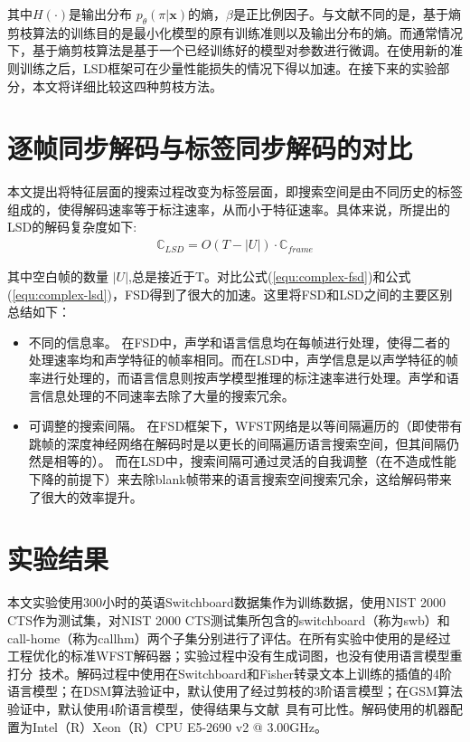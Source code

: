 其中$H(\cdot)$是输出分布 $p_\theta (\pi|\mathbf{x})$的熵，$\beta$是正比例因子。与文献\cite{pereyra2017regularizing}不同的是，基于熵剪枝算法的训练目的是最小化模型的原有训练准则以及输出分布的熵。而通常情况下，基于熵剪枝算法是基于一个已经训练好的模型对参数进行微调。在使用新的准则训练之后，LSD框架可在少量性能损失的情况下得以加速。在接下来的实验部分，本文将详细比较这四种剪枝方法。



\section{逐帧同步解码与标签同步解码的对比}
\label{chap:lsd-lsd-hmm-alg}

本文提出将特征层面的搜索过程改变为标签层面，即搜索空间是由不同历史的标签组成的，使得解码速率等于标注速率，从而小于特征速率。具体来说，所提出的LSD的解码复杂度如下:
  \begin{equation}
\label{equ:complex-lsd}
\begin{split}
\mathbb{C}_{LSD} = O (T-|U|) \cdot \mathbb{C}_{frame}
\end{split}
\end{equation}


其中空白帧的数量 $|U|$,总是接近于T。对比公式(\ref{equ:complex-fsd})和公式(\ref{equ:complex-lsd})，FSD得到了很大的加速。这里将FSD和LSD之间的主要区别总结如下：
\begin{itemize}
\item 不同的信息率。 在FSD中，声学和语言信息均在每帧进行处理，使得二者的处理速率均和声学特征的帧率相同。而在LSD中，声学信息是以声学特征的帧率进行处理的，而语言信息则按声学模型推理的标注速率进行处理。声学和语言信息处理的不同速率去除了大量的搜索冗余。
\item 可调整的搜索间隔。 在FSD框架下，WFST网络是以等间隔遍历的（即使带有跳帧的深度神经网络在解码\cite{vanhoucke2013multiframe}时是以更长的间隔遍历语言搜索空间，但其间隔仍然是相等的）。 而在LSD中，搜索间隔可通过灵活的自我调整（在不造成性能下降的前提下）来去除blank帧带来的语言搜索空间搜索冗余，这给解码带来了很大的效率提升。
\end{itemize}


\section{实验结果}
\label{chap:lsd-exp}

本文实验使用300小时的英语Switchboard数据集作为训练数据\cite{godfrey1992switchboard}，使用NIST 2000 CTS作为测试集，对NIST 2000 CTS测试集所包含的switchboard（称为swb）和call-home（称为callhm）两个子集分别进行了评估。在所有实验中使用的是经过工程优化的标准WFST解码器；实验过程中没有生成词图，也没有使用语言模型重打分~\cite{povey2012generating}技术。解码过程中使用在Switchboard和Fisher转录文本上训练的插值的4阶语言模型；在DSM算法验证中，默认使用了经过剪枝的3阶语言模型；在GSM算法验证中，默认使用4阶语言模型，使得结果与文献~\cite{povey2016purely}具有可比性。解码使用的机器配置为Intel（R）Xeon（R）CPU E5-2690 v2 @ 3.00GHz。

